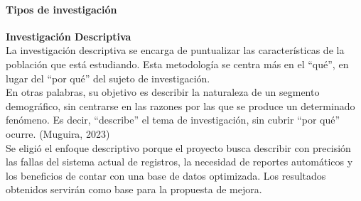 \documentclass[12pt, letterpaper]{article}
\begin{document}
\paragraph{Tipos de investigación}
\textbf{Investigación Descriptiva}\\
La investigación descriptiva se encarga de puntualizar las características de la población que está estudiando. Esta metodología se centra más en el “qué”, en lugar del “por qué” del sujeto de investigación.\\
En otras palabras, su objetivo es describir la naturaleza de un segmento demográfico, sin centrarse en las razones por las que se produce un determinado fenómeno. Es decir, “describe” el tema de investigación, sin cubrir “por qué” ocurre. (Muguira, 2023)\\
Se eligió el enfoque descriptivo porque el proyecto busca describir con precisión las fallas del sistema actual de registros, la necesidad de reportes automáticos y los beneficios de contar con una base de datos optimizada. Los resultados obtenidos servirán como base para la propuesta de mejora.
\end{document}
